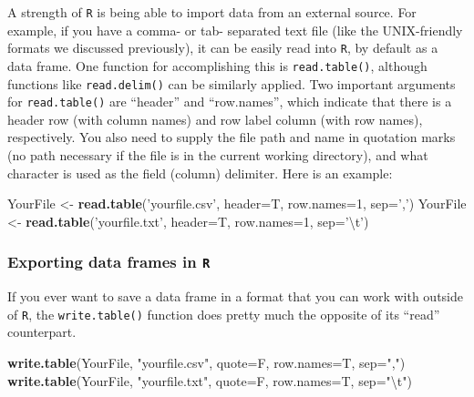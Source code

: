 \documentclass[]{book}
\newenvironment{Shaded}{\begin{snugshade}}{\end{snugshade}}
\newcommand{\CharTok}[1]{\textcolor[rgb]{0.31,0.60,0.02}{#1}}
\newcommand{\DataTypeTok}[1]{\textcolor[rgb]{0.13,0.29,0.53}{#1}}
\newcommand{\DecValTok}[1]{\textcolor[rgb]{0.00,0.00,0.81}{#1}}
\newcommand{\KeywordTok}[1]{\textcolor[rgb]{0.13,0.29,0.53}{\textbf{#1}}}
\newcommand{\NormalTok}[1]{#1}
\newcommand{\StringTok}[1]{\textcolor[rgb]{0.31,0.60,0.02}{#1}}
\begin{document}
A strength of \texttt{R} is being able to import data from an external source. For example, if you have a comma- or tab- separated text file (like the UNIX-friendly formats we discussed previously), it can be easily read into \texttt{R}, by default as a data frame. One function for accomplishing this is \texttt{read.table()}, although functions like \texttt{read.delim()} can be similarly applied. Two important arguments for \texttt{read.table()} are ``header'' and ``row.names'', which indicate that there is a header row (with column names) and row label column (with row names), respectively. You also need to supply the file path and name in quotation marks (no path necessary if the file is in the current working directory), and what character is used as the field (column) delimiter. Here is an example:

\begin{Shaded}
\begin{Highlighting}[]
\NormalTok{YourFile <-}\StringTok{ }\KeywordTok{read.table}\NormalTok{(}\StringTok{'yourfile.csv'}\NormalTok{, }\DataTypeTok{header=}\NormalTok{T, }\DataTypeTok{row.names=}\DecValTok{1}\NormalTok{, }\DataTypeTok{sep=}\StringTok{','}\NormalTok{)}
\NormalTok{YourFile <-}\StringTok{ }\KeywordTok{read.table}\NormalTok{(}\StringTok{'yourfile.txt'}\NormalTok{, }\DataTypeTok{header=}\NormalTok{T, }\DataTypeTok{row.names=}\DecValTok{1}\NormalTok{, }\DataTypeTok{sep=}\StringTok{'}\CharTok{\textbackslash{}t}\StringTok{'}\NormalTok{)}
\end{Highlighting}
\end{Shaded}

\hypertarget{exporting-data-frames-in-r}{%
\subsubsection{\texorpdfstring{Exporting data frames in \texttt{R}}{Exporting data frames in R}}\label{exporting-data-frames-in-r}}

If you ever want to save a data frame in a format that you can work with outside of \texttt{R}, the \texttt{write.table()} function does pretty much the opposite of its ``read'' counterpart.

\begin{Shaded}
\begin{Highlighting}[]
\KeywordTok{write.table}\NormalTok{(YourFile, }\StringTok{"yourfile.csv"}\NormalTok{, }\DataTypeTok{quote=}\NormalTok{F, }\DataTypeTok{row.names=}\NormalTok{T, }\DataTypeTok{sep=}\StringTok{","}\NormalTok{)}
\KeywordTok{write.table}\NormalTok{(YourFile, }\StringTok{"yourfile.txt"}\NormalTok{, }\DataTypeTok{quote=}\NormalTok{F, }\DataTypeTok{row.names=}\NormalTok{T, }\DataTypeTok{sep=}\StringTok{"}\CharTok{\textbackslash{}t}\StringTok{"}\NormalTok{)}
\end{Highlighting}
\end{Shaded}
\end{document}
